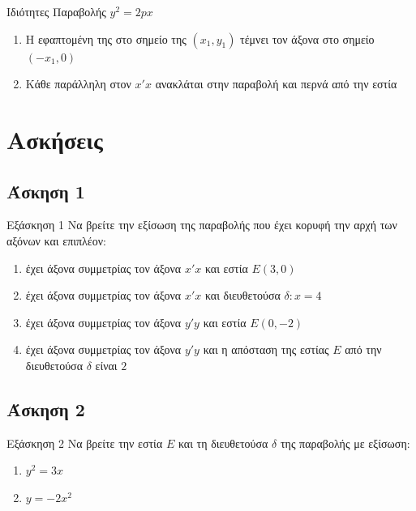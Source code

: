 \documentclass[greek]{beamer}
\begin{document}
\begin{frame}[label=Ιδιότητες]{Ιδιότητες Παραβολής $y^2=2px$}
 \begin{enumerate}
  \item<1-> Η εφαπτομένη της στο σημείο της $(x_1,y_1)$ τέμνει τον άξονα στο σημείο $(-x_1,0)$
  \item<2-> Κάθε παράλληλη στον $x'x$ ανακλάται στην παραβολή και περνά από την εστία
 \end{enumerate}

\end{frame}

\section{Ασκήσεις}
\subsection{Άσκηση 1}
\begin{frame}[label=Άσκηση1,t]{Εξάσκηση 1}
 Να βρείτε την εξίσωση της παραβολής που έχει κορυφή την αρχή των αξόνων και επιπλέον:
 \begin{enumerate}
  \item<1-> έχει άξονα συμμετρίας τον άξονα $x'x$ και εστία $Ε(3,0)$
  \item<2-> έχει άξονα συμμετρίας τον άξονα $x'x$ και διευθετούσα $δ:x=4$
  \item<3-> έχει άξονα συμμετρίας τον άξονα $y'y$ και εστία $Ε(0,-2)$
  \item<4-> έχει άξονα συμμετρίας τον άξονα $y'y$ και η απόσταση της εστίας $Ε$ από την διευθετούσα $δ$ είναι $2$
 \end{enumerate}

\end{frame}

\subsection{Άσκηση 2}
\begin{frame}[label=Άσκηση2,t]{Εξάσκηση 2}
 Να βρείτε την εστία $Ε$ και τη διευθετούσα $δ$ της παραβολής με εξίσωση:
 \begin{enumerate}
  \item<1-> $y^2=3x$
  \item<2-> $y=-2x^2$
 \end{enumerate}

\end{frame}
\end{document}
